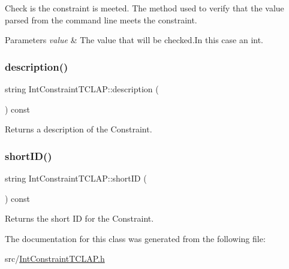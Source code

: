 Check is the constraint is meeted. The method used to verify that the value parsed from the command line meets the constraint. 


\begin{DoxyParams}{Parameters}
{\em value} & The value that will be checked.\+In this case an int. \\
\hline
\end{DoxyParams}
\hypertarget{class_int_constraint_t_c_l_a_p_a44b1af8311beda265ca3fe8739d2fead}{}\label{class_int_constraint_t_c_l_a_p_a44b1af8311beda265ca3fe8739d2fead} 
\subsubsection{\texorpdfstring{description()}{description()}}
{\footnotesize\ttfamily string Int\+Constraint\+T\+C\+L\+A\+P\+::description (\begin{DoxyParamCaption}{ }\end{DoxyParamCaption}) const\hspace{0.3cm}{\ttfamily [virtual]}}

Returns a description of the Constraint. \hypertarget{class_int_constraint_t_c_l_a_p_af03964c4fd7094906df176a0b932a339}{}\label{class_int_constraint_t_c_l_a_p_af03964c4fd7094906df176a0b932a339} 
\subsubsection{\texorpdfstring{short\+I\+D()}{shortID()}}
{\footnotesize\ttfamily string Int\+Constraint\+T\+C\+L\+A\+P\+::short\+ID (\begin{DoxyParamCaption}{ }\end{DoxyParamCaption}) const\hspace{0.3cm}{\ttfamily [virtual]}}

Returns the short ID for the Constraint. 

The documentation for this class was generated from the following file\+:\begin{DoxyCompactItemize}
\item 
src/\hyperlink{_int_constraint_t_c_l_a_p_8h}{Int\+Constraint\+T\+C\+L\+A\+P.\+h}\end{DoxyCompactItemize}
